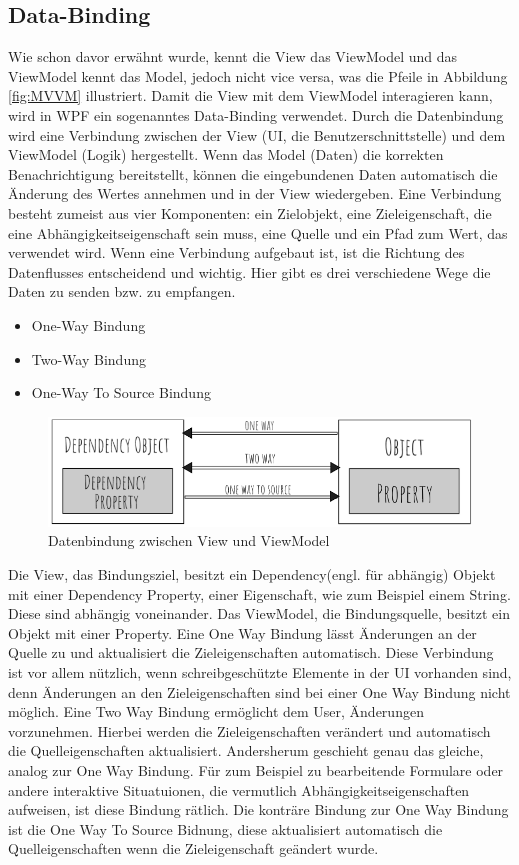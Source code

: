 \subsection*{Data-Binding}
Wie schon davor erw\"ahnt wurde, kennt die View das ViewModel und das ViewModel kennt das Model, jedoch nicht vice versa, was die Pfeile in Abbildung \ref{fig:MVVM} illustriert.
Damit die View mit dem ViewModel interagieren kann, wird in WPF ein sogenanntes Data-Binding verwendet.
Durch die Datenbindung wird eine Verbindung zwischen der View (\ac{UI}, die Benutzerschnittstelle) und dem ViewModel (Logik) hergestellt. Wenn das Model (Daten) die korrekten Benachrichtigung bereitstellt, k\"onnen die eingebundenen Daten automatisch die \"Anderung des Wertes annehmen und in der View wiedergeben\cite{Cai2017}.
Eine Verbindung besteht zumeist aus vier Komponenten: ein Zielobjekt, eine Zieleigenschaft, die eine Abh\"angigkeitseigenschaft sein muss, eine Quelle und ein Pfad zum Wert, das verwendet wird. 
Wenn eine Verbindung aufgebaut ist, ist die Richtung des Datenflusses entscheidend und wichtig. Hier gibt es drei verschiedene Wege die Daten zu senden bzw. zu empfangen.
\begin{itemize}
\item One-Way Bindung
\item Two-Way Bindung
\item One-Way To Source Bindung
\end{itemize}
\begin{figure}[h] 
\centering
\includegraphics[scale=0.55]{fig/Data-Binding.png} 
\caption{Datenbindung zwischen View und ViewModel}
\label{fig:DataBinding}
\end{figure} 
Die View, das Bindungsziel, besitzt ein Dependency(engl. f\"ur abh\"angig) Objekt mit einer Dependency Property, einer Eigenschaft, wie zum Beispiel einem String. Diese sind abh\"angig voneinander. Das ViewModel, die Bindungsquelle, besitzt ein Objekt mit einer Property. Eine One Way Bindung l\"asst \"Anderungen an der Quelle zu und aktualisiert die Zieleigenschaften automatisch. Diese Verbindung ist vor allem n\"utzlich, wenn schreibgesch\"utzte Elemente in der \ac{UI} vorhanden sind, denn \"Anderungen an den Zieleigenschaften sind bei einer One Way Bindung nicht m\"oglich.
Eine Two Way Bindung erm\"oglicht dem User, \"Anderungen vorzunehmen. Hierbei werden die Zieleigenschaften ver\"andert und automatisch die Quelleigenschaften aktualisiert. Andersherum geschieht genau das gleiche, analog zur One Way Bindung. F\"ur zum Beispiel zu bearbeitende Formulare oder andere interaktive Situatuionen, die vermutlich Abh\"angigkeitseigenschaften aufweisen, ist diese Bindung r\"atlich.
Die kontr\"are Bindung zur One Way Bindung ist die One Way To Source Bidnung, diese aktualisiert automatisch die Quelleigenschaften wenn die Zieleigenschaft ge\"andert wurde.
